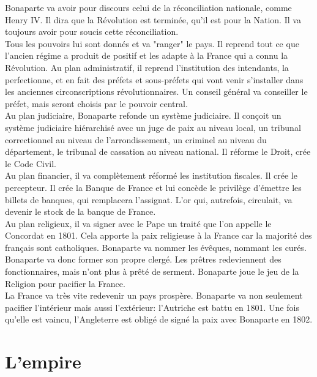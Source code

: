 \documentclass[10pt, a4paper, openany]{book}
\begin{document}
Bonaparte va avoir pour discours celui de la réconciliation nationale, comme Henry IV. Il dira que la Révolution est terminée, qu'il est pour la Nation. Il va toujours avoir pour soucis cette réconciliation. \\
Tous les pouvoirs lui sont donnés et va "ranger" le pays. Il reprend tout ce que l'ancien régime a produit de positif et les adapte à la France qui a connu la Révolution. Au plan administratif, il reprend l'institution des intendants, la perfectionne, et en fait des préfets et sous-préfets qui vont venir s'installer dans les anciennes circonscriptions révolutionnaires. Un conseil général va conseiller le préfet, mais seront choisis par le pouvoir central. \\
Au plan judiciaire, Bonaparte refonde un système judiciaire. Il conçoit un système judiciaire hiérarchisé avec un juge de paix au niveau local, un tribunal correctionnel au niveau de l'arrondissement, un criminel au niveau du département, le tribunal de cassation au niveau national. Il réforme le Droit, crée le Code Civil. \\
Au plan financier, il va complètement réformé les institution fiscales. Il crée le percepteur. Il crée la Banque de France et lui concède le privilège d'émettre les billets de banques, qui remplacera l'assignat. L'or qui, autrefois, circulait, va devenir le stock de la banque de France. \\
Au plan religieux, il va signer avec le Pape un traité que l'on appelle le Concordat en 1801. Cela apporte la paix religieuse à la France car la majorité des français sont catholiques. Bonaparte va nommer les évêques, nommant les curés. Bonaparte va donc former son propre clergé. Les prêtres redeviennent des fonctionnaires, mais n'ont plus à prêté de serment. Bonaparte joue le jeu de la Religion pour pacifier la France. \\
La France va très vite redevenir un pays prospère. Bonaparte va non seulement pacifier l'intérieur mais aussi l'extérieur: l'Autriche est battu en 1801. Une fois qu'elle est vaincu, l'Angleterre est obligé de signé la paix avec Bonaparte en 1802. 

\section{L'empire}
\end{document}
